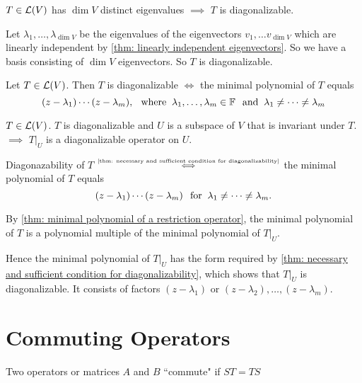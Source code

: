 \setcounter{thm}{57}
\begin{thm} 
  \label{thm: enough eigenvalues implies diagonalizability}
  $T\in \mathcal{L}(V)$ has $\dim V$ distinct eigenvalues $\implies$ $T$ is diagonalizable.
\end{thm}
\begin{prf}
  Let $\lambda_1, \ldots, \lambda_{\dim V}$ be the eigenvalues of the eigenvectors $v_1, \ldots v_{\dim V}$ which are linearly independent by \autoref{thm: linearly independent eigenvectors}. So we have a basis consisting of $\dim V$ eigenvectors. So $T$ is diagonalizable.
\end{prf}

\setcounter{thm}{61}
\begin{thm}
  \label{thm: necessary and sufficient condition for diagonalizability}
  Let $T\in \mathcal{L} (V)$\footnotemark[1]. Then $T$ is diagonalizable $\iff$ the minimal polynomial of $T$ equals
  \begin{equation}
    (z-\lambda_1) \cdots (z-\lambda_m), \;\;\, \text{where}\;\; \lambda_1, \dots, \lambda_m \in \mathbb{F} \;\;\, \text{and}\;\; \lambda_1 \neq \cdots \neq \lambda_m
  \end{equation}
\end{thm}

\setcounter{thm}{64}
\begin{thm}
  \label{thm: restriction of diagonalizable operator to invariant subspace}
  $T\in \mathcal{L}(V)$. $T$ is diagonalizable and $U$ is a subspace of $V$ that is invariant under $T$. \\
  $\implies$ $\left.T\right|_U$ is a diagonalizable operator on $U$.
\end{thm}
\begin{prf}
  Diagonazability of $T$ $\mathsmaller{\overset{\text{\ref{thm: necessary and sufficient condition for diagonalizability}}}{\iff}}$ the minimal polynomial of $T$ equals 
  \begin{equation}
    (z-\lambda_1)\cdots(z-\lambda_m) \;\;\, \text{for}\;\; \lambda_1 \neq \cdots \neq \lambda_m.
  \end{equation} 
  
  By \ref{thm: minimal polynomial of a restriction operator}, the minimal polynomial of $T$ is a polynomial multiple of the minimal polynomial of $\left.T\right|_U$.
  
  Hence the minimal polynomial of $\left.T\right|_U$  has the form required by \ref{thm: necessary and sufficient condition for diagonalizability}, which shows that $\left.T\right|_U$ is diagonalizable. It consists of factors $(z-\lambda_1)$ or $(z-\lambda_2), \dots, (z-\lambda_m)$.
\end{prf}


\section{Commuting Operators}
\begin{mydef}
  Two operators or matrices $A$ and $B$ ``commute" if $ST=TS$
\end{mydef}